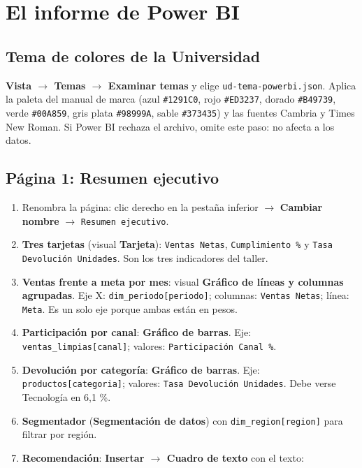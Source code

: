 \documentclass[11pt,letterpaper]{article}
\newcommand{\ui}[1]{\textbf{#1}}                 %
\begin{document}
\section{El informe de Power BI}

\subsection{Tema de colores de la Universidad}

\ui{Vista $\rightarrow$ Temas $\rightarrow$ Examinar temas} y elige \texttt{ud-tema-powerbi.json}. Aplica la paleta del manual de marca
(azul \texttt{\#1291C0}, rojo \texttt{\#ED3237}, dorado \texttt{\#B49739}, verde \texttt{\#00A859}, gris plata \texttt{\#98999A}, sable \texttt{\#373435})
y las fuentes Cambria y Times New Roman. Si Power BI rechaza el archivo, omite este paso: no afecta a los datos.

\subsection{Página 1: Resumen ejecutivo}

\begin{enumerate}
  \item Renombra la página: clic derecho en la pestaña inferior $\rightarrow$ \ui{Cambiar nombre} $\rightarrow$ \texttt{Resumen ejecutivo}.
  \item \textbf{Tres tarjetas} (visual \ui{Tarjeta}): \texttt{Ventas Netas}, \texttt{Cumplimiento \%} y \texttt{Tasa Devolución Unidades}. Son los tres indicadores del taller.
  \item \textbf{Ventas frente a meta por mes}: visual \ui{Gráfico de líneas y columnas agrupadas}. Eje X: \texttt{dim\_periodo[periodo]}; columnas: \texttt{Ventas Netas}; línea: \texttt{Meta}. Es un solo eje porque ambas están en pesos.
  \item \textbf{Participación por canal}: \ui{Gráfico de barras}. Eje: \texttt{ventas\_limpias[canal]}; valores: \texttt{Participación Canal \%}.
  \item \textbf{Devolución por categoría}: \ui{Gráfico de barras}. Eje: \texttt{productos[categoria]}; valores: \texttt{Tasa Devolución Unidades}. Debe verse Tecnología en 6,1 \%.
  \item \textbf{Segmentador} (\ui{Segmentación de datos}) con \texttt{dim\_region[region]} para filtrar por región.
  \item \textbf{Recomendación}: \ui{Insertar $\rightarrow$ Cuadro de texto} con el texto:
\end{enumerate}
\end{document}
